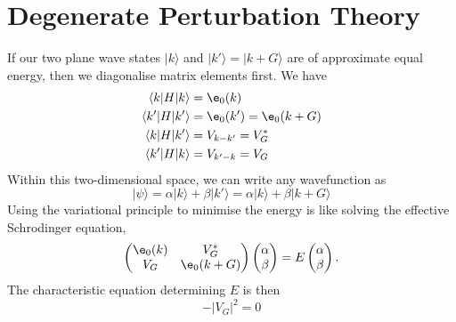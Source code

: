 \documentclass[a4paper, 11pt, normalem]{report}
\begin{document}
\section{Degenerate Perturbation Theory}
If our two plane wave states $|k\rangle$ and $|k'\rangle = |k+G\rangle$ are of approximate equal energy, then we diagonalise matrix elements first. 
We have
\begin{align}
    \langle k|H|k\rangle &= \e_0(k) \\
    \langle k'|H|k'\rangle &= \e_0(k') = \e_0(k+G) \\
    \langle k|H|k'\rangle &= V_{k-k'} = V^*_G \\
    \langle k'|H|k\rangle &= V_{k'-k} = V_G
\end{align}
Within this two-dimensional space, we can write any wavefunction as
\begin{equation}
    |\psi\rangle = \alpha|k\rangle + \beta|k'\rangle = \alpha|k\rangle + \beta|k+G\rangle
\end{equation}
Using the variational principle to minimise the energy is like solving the effective Schrodinger equation,
\begin{equation}
    \begin{pmatrix}
        \e_0(k) & V_G^* \\
        V_G & \e_0(k+G) 
    \end{pmatrix}
    \begin{pmatrix}
        \alpha \\
        \beta
    \end{pmatrix} = E
    \begin{pmatrix}
        \alpha \\
        \beta
    \end{pmatrix}.
\end{equation}
The characteristic equation determining $E$ is then
\begin{equation}
    [\e_0(k) - E][\e_0(k+G) - E] - |V_G|^2 = 0
\end{equation}
\end{document}
